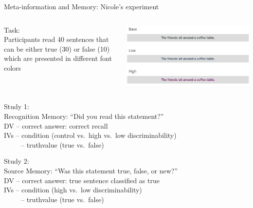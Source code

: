 \documentclass[aspectratio=169]{beamer}
\begin{document}
\begin{frame}{Meta-information and Memory: Nicole's experiment}
      \begin{columns}
        \begin{column}[c]{.62\textwidth}
    {\color{iwmorange}Task:}\\
          Participants read 40 sentences that can be either true (30)
      or false (10) which are presented in different font colors\\ 
        \end{column}
        \begin{column}[c]{.3\textwidth}
      \includegraphics[scale = .3]{../figures/material}
        \end{column}
      \end{columns}

  {\color{iwmorange}Study 1:}\\
  Recognition Memory: ``Did you read this statement?''\\
      DV -- correct answer: correct recall\\
      IVs -- condition (control vs.\ high vs.\ low discriminability)\\
      ~~~~~-- truthvalue (true vs.\ false)

    {\color{iwmorange}Study 2:}\\
    Source Memory: ``Was this statement true, false, or
      new?''\\
      DV -- correct answer: true sentence classified as true\\
      IVs -- condition (high vs.\ low discriminability)\\
      ~~~~~-- truthvalue (true vs.\ false)
\end{frame}
\end{document}
